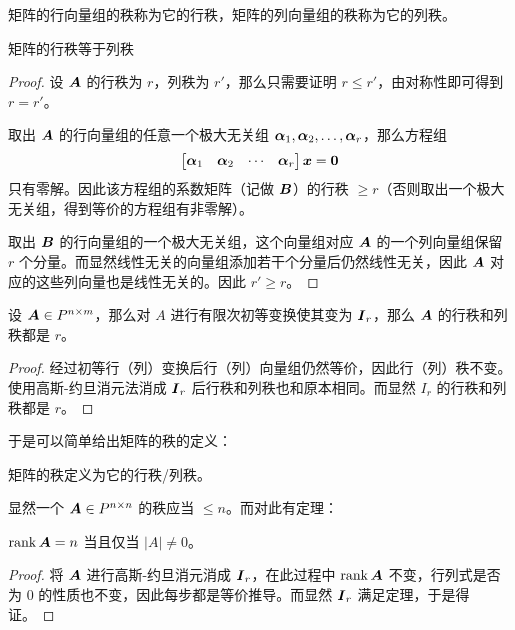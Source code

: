 \begin{definition}[行秩和列秩]
	矩阵的行向量组的秩称为它的行秩，矩阵的列向量组的秩称为它的列秩。
\end{definition}

\begin{theorem}
	矩阵的行秩等于列秩

	\begin{proof}
		设 $\boldsymbol{A}$ 的行秩为 $r$，列秩为 $r'$，那么只需要证明 $r \le r'$，由对称性即可得到 $r = r'$。
		
		取出 $\boldsymbol{A}$ 的行向量组的任意一个极大无关组 $\boldsymbol{\alpha}_1, \boldsymbol{\alpha}_2, \dots, \boldsymbol{\alpha}_r$，那么方程组
		$$
		\begin{bmatrix}
			\boldsymbol{\alpha}_1 & \boldsymbol{\alpha}_2 & \cdots & \boldsymbol{\alpha}_r
		\end{bmatrix} \boldsymbol{x} = \boldsymbol{0}
		$$
		只有零解。因此该方程组的系数矩阵（记做 $\boldsymbol{B}$）的行秩 $\ge r$（否则取出一个极大无关组，得到等价的方程组有非零解）。

		取出 $\boldsymbol{B}$ 的行向量组的一个极大无关组，这个向量组对应 $\boldsymbol{A}$ 的一个列向量组保留 $r$ 个分量。而显然线性无关的向量组添加若干个分量后仍然线性无关，因此 $\boldsymbol{A}$ 对应的这些列向量也是线性无关的。因此 $r' \ge r$。
	\end{proof}
\end{theorem}

\begin{theorem}
	设 $\boldsymbol{A} \in P^{n \times m}$，那么对 $A$ 进行有限次初等变换使其变为 $\boldsymbol{I}_r$，那么 $\boldsymbol{A}$ 的行秩和列秩都是 $r$。

	\begin{proof}
		经过初等行（列）变换后行（列）向量组仍然等价，因此行（列）秩不变。使用高斯-约旦消元法消成 $\boldsymbol{I}_r$ 后行秩和列秩也和原本相同。而显然 $I_r$ 的行秩和列秩都是 $r$。
	\end{proof}
\end{theorem}

于是可以简单给出矩阵的秩的定义：

\begin{definition}[矩阵的秩]
	矩阵的秩定义为它的行秩/列秩。
\end{definition}

显然一个 $\boldsymbol{A} \in P^{n \times n}$ 的秩应当 $\le n$。而对此有定理：

\begin{theorem}
	$\operatorname{rank} \boldsymbol{A} = n$ 当且仅当 $|A| \neq 0$。

	\begin{proof}
		将 $\boldsymbol{A}$ 进行高斯-约旦消元消成 $\boldsymbol{I}_r$，在此过程中 $\operatorname{rank} \boldsymbol{A}$ 不变，行列式是否为 $0$ 的性质也不变，因此每步都是等价推导。而显然 $\boldsymbol{I}_r$ 满足定理，于是得证。
	\end{proof}
\end{theorem}

